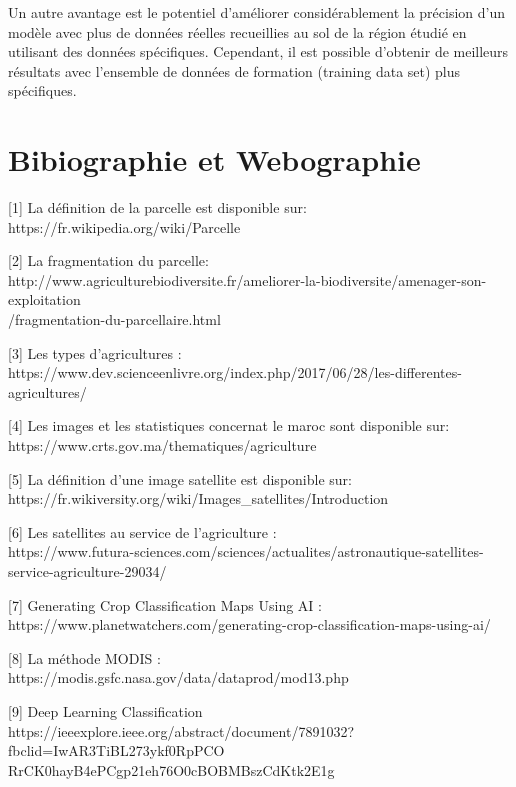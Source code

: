 \documentclass[12pt, openany]{report}
\begin{document}
Un autre avantage est le potentiel d'améliorer considérablement la précision d'un modèle avec plus de données réelles recueillies au sol de la région étudié en utilisant des données spécifiques. Cependant, il est possible d'obtenir de meilleurs résultats avec l'ensemble de données de formation (training data set) plus spécifiques.

\chapter*{Bibiographie et Webographie}
\label{sec:refs}
\begin{description}

\item{[1]} La définition de la parcelle est disponible sur:
\\ https://fr.wikipedia.org/wiki/Parcelle

\item{[2]} La fragmentation du parcelle:
\\ http://www.agriculturebiodiversite.fr/ameliorer-la-biodiversite/amenager-son-exploitation\\/fragmentation-du-parcellaire.html

\item{[3]} Les types d'agricultures :
\\ https://www.dev.scienceenlivre.org/index.php/2017/06/28/les-differentes-agricultures/

\item{[4]}  Les images et les statistiques concernat le maroc sont disponible sur:
\\ https://www.crts.gov.ma/thematiques/agriculture

\item{[5]} La définition d'une image satellite est disponible sur:
\\ https://fr.wikiversity.org/wiki/Images\_satellites/Introduction

\item{[6]} Les satellites au service de l'agriculture :
\\ https://www.futura-sciences.com/sciences/actualites/astronautique-satellites-service-agriculture-29034/

\item{[7]} Generating Crop Classification Maps Using AI :
\\ https://www.planetwatchers.com/generating-crop-classification-maps-using-ai/

\item{[8]} La méthode MODIS :
\\ https://modis.gsfc.nasa.gov/data/dataprod/mod13.php

\item{[9]} Deep Learning Classification
\\ https://ieeexplore.ieee.org/abstract/document/7891032?fbclid=IwAR3TiBL273ykf0RpPCO\\RrCK0hayB4ePCgp21eh76O0cBOBMBszCdKtk2E1g


\end{description}
\end{document}
